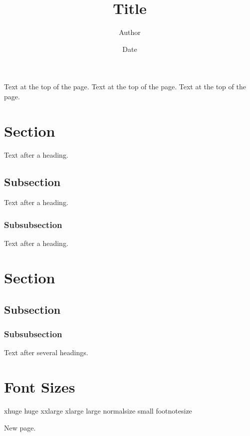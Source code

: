 \documentclass[11pt]{kharticle}
\title{Title}
\author{Author}
\date{Date}
\begin{document}
\maketitle

Text at the top of the page. Text at the top of the page. Text at the top of the page.

\section{Section}
Text after a heading.

\subsection{Subsection}
Text after a heading.

\subsubsection{Subsubsection}
Text after a heading.

\section{Section}
\subsection{Subsection}
\subsubsection{Subsubsection}
Text after several headings.

\section{Font Sizes}
\Huge xhuge
\huge huge
\LARGE xxlarge
\Large xlarge
\large large
\normalsize normalsize
\small small
\footnotesize footnotesize

\newpage

New page.
\end{document}
